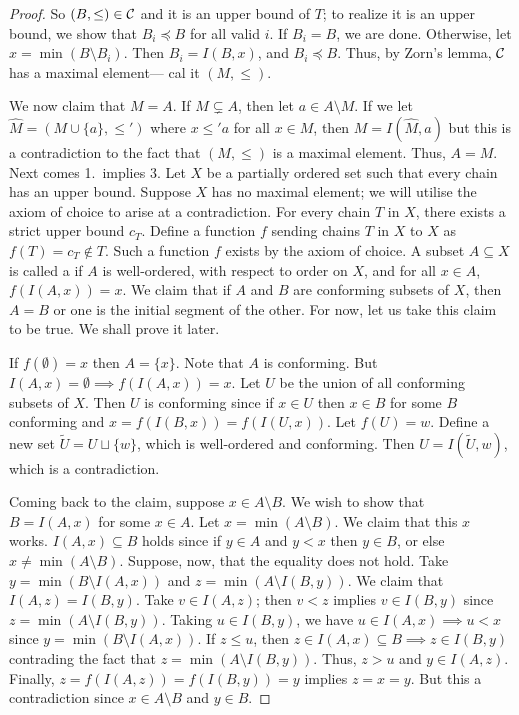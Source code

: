 \begin{proof}
    So $(B,\leq) \in \mathcal{C}$ and it is an upper bound of $T$; to realize it is an upper bound, we show that $B_{i} \preceq B$ for all valid $i$. If $B_{i} = B$, we are done. Otherwise, let $x = \min (B \setminus B_{i})$. Then $B_{i} = I(B,x)$, and $B_{i} \preceq B$. Thus, by Zorn's lemma, $\mathcal{C}$ has a maximal element--- cal it $(M, \leq)$.

    We now claim that $M = A$. If $M \subsetneq A$, then let $a \in A \setminus M$. If we let $\hat{M} = (M \cup \{a\}, \leq')$ where $x \leq' a$ for all $x \in M$, then $M = I(\hat{M},a)$ but this is a contradiction to the fact that $(M,\leq)$ is a maximal element. Thus, $A = M$.\\

    Next comes 1.~implies 3. Let $X$ be a partially ordered set such that every chain has an upper bound. Suppose $X$ has no maximal element; we will utilise the axiom of choice to arise at a contradiction. For every chain $T$ in $X$, there exists a strict upper bound $c_{T}$. Define a function $f$ sending chains $T$ in $X$ to $X$ as $f(T) = c_{T} \notin T$. Such a function $f$ exists by the axiom of choice. A subset $A \subseteq X$ is called a  if $A$ is well-ordered, with respect to order on $X$, and for all $x \in A$, $f(I(A,x)) = x$. We claim that if $A$ and $B$ are conforming subsets of $X$, then $A = B$ or one is the initial segment of the other. For now, let us take this claim to be true. We shall prove it later.

    If $f(\emptyset) = x$ then $A = \{x\}$. Note that $A$ is conforming. But $I(A,x) = \emptyset \implies f(I(A,x)) = x$. Let $U$ be the union of all conforming subsets of $X$. Then $U$ is conforming since if $x \in U$ then $x \in B$ for some $B$ conforming and $x = f(I(B,x)) = f(I(U,x))$. Let $f(U) = w$. Define a new set $\tilde{U} = U \sqcup \{w\}$, which is well-ordered and conforming. Then $U = I(\tilde{U},w)$, which is a contradiction.

    Coming back to the claim, suppose $x \in A \setminus B$. We wish to show that $B = I(A,x)$ for some $x \in A$. Let $x = \min(A\setminus B)$. We claim that this $x$ works. $I(A,x) \subseteq B$ holds since if $y \in A$ and $y < x$ then $y \in B$, or else $x \neq \min (A\setminus B)$. Suppose, now, that the equality does not hold. Take $y = \min (B \setminus I(A,x))$ and $z = \min (A \setminus I(B,y))$. We claim that $I(A,z) = I(B,y)$. Take $v \in I(A,z)$; then $v < z$ implies $v \in I(B,y)$ since $z = \min(A\setminus I(B,y))$. Taking $u \in I(B,y)$, we have $u \in I(A,x) \implies u < x$ since $y = \min(B\setminus I(A,x))$. If $z \leq u$, then $z \in I(A,x) \subseteq B \implies z \in I(B,y)$ contrading the fact that $z = \min (A\setminus I(B,y))$. Thus, $z > u$ and $y \in I(A,z)$. Finally, $z = f(I(A,z)) = f(I(B,y)) = y$ implies $z = x = y$. But this a contradiction since $x \in A\setminus B$ and $y \in B$.
\end{proof}

